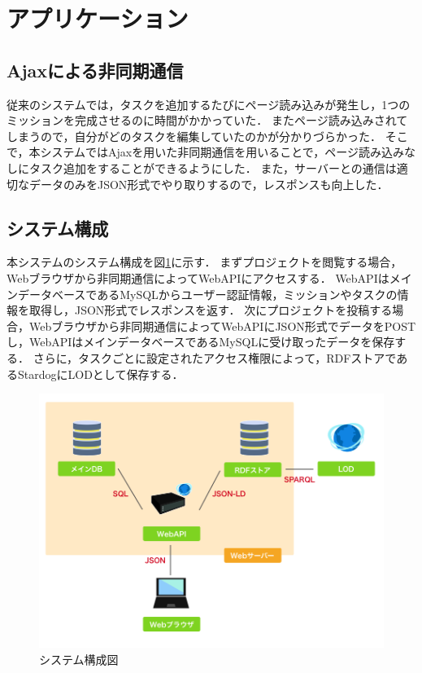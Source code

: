 \section{アプリケーション}
\subsection{Ajaxによる非同期通信}
従来のシステムでは，タスクを追加するたびにページ読み込みが発生し，1つのミッションを完成させるのに時間がかかっていた．
またページ読み込みされてしまうので，自分がどのタスクを編集していたのかが分かりづらかった．
そこで，本システムではAjaxを用いた非同期通信を用いることで，ページ読み込みなしにタスク追加をすることができるようにした．
また，サーバーとの通信は適切なデータのみをJSON形式でやり取りするので，レスポンスも向上した．

\subsection{システム構成}
本システムのシステム構成を図\ref{img:system_architecture}に示す．
まずプロジェクトを閲覧する場合，Webブラウザから非同期通信によってWebAPIにアクセスする．
WebAPIはメインデータベースであるMySQLからユーザー認証情報，ミッションやタスクの情報を取得し，JSON形式でレスポンスを返す．
次にプロジェクトを投稿する場合，Webブラウザから非同期通信によってWebAPIにJSON形式でデータをPOSTし，WebAPIはメインデータベースであるMySQLに受け取ったデータを保存する．
さらに，タスクごとに設定されたアクセス権限によって，RDFストアであるStardogにLODとして保存する．

\begin{figure}[t]
	\begin{center}
		\includegraphics[width=0.9\linewidth]{assets/img/system_architecture.png}
		\caption{システム構成図}
		\label{img:system_architecture}
	\end{center}
\end{figure}

